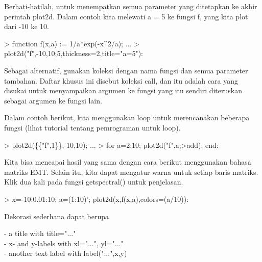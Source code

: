 \documentclass{report}
\begin{document}
\begin{eulernotebook}
\begin{eulercomment}
\begin{eulercomment}
\begin{eulercomment}
\begin{eulercomment}
\begin{eulercomment}
Berhati-hatilah, untuk menempatkan semua parameter yang ditetapkan ke
akhir perintah plot2d. Dalam contoh kita melewati a = 5 ke fungsi f,
yang kita plot dari -10 ke 10.
\end{eulercomment}
\begin{eulerprompt}
> function f(x,a) := 1/a*exp(-x^2/a); ...
> plot2d("f",-10,10;5,thickness=2,title="a=5"):
\end{eulerprompt}
\begin{eulercomment}
Sebagai alternatif, gunakan koleksi dengan nama fungsi dan semua
parameter tambahan. Daftar khusus ini disebut koleksi call, dan itu
adalah cara yang disukai untuk menyampaikan argumen ke fungsi yang itu
sendiri diteruskan sebagai argumen ke fungsi lain.

Dalam contoh berikut, kita menggunakan loop untuk merencanakan
beberapa fungsi (lihat tutorial tentang pemrograman untuk loop).
\end{eulercomment}
\begin{eulerprompt}
> plot2d(\{\{"f",1\}\},-10,10); ...
> for a=2:10; plot2d("f",a;>add); end:
\end{eulerprompt}
\begin{eulercomment}
Kita bisa mencapai hasil yang sama dengan cara berikut menggunakan
bahasa matriks EMT. Selain itu, kita dapat mengatur warna untuk setiap
baris matriks. Klik dua kali pada fungsi getspectral() untuk
penjelasan.
\end{eulercomment}
\begin{eulerprompt}
> x=-10:0.01:10; a=(1:10)'; plot2d(x,f(x,a),colors=(a/10)):
\end{eulerprompt}
\begin{eulercomment}
Dekorasi sederhana dapat berupa

- a title with title="..."\\
- x- and y-labels with xl="...", yl="..."\\
- another text label with label("...",x,y)


\end{eulercomment}
\end{eulercomment}
\end{eulercomment}
\end{eulercomment}
\end{eulercomment}
\end{eulernotebook}
\end{document}
